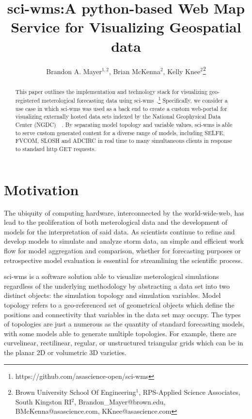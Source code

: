 \documentclass[11pt,twocolumn,twoside]{IEEEtran}
\begin{document}
\title{\vspace{0.2in}\sc sci-wms:A python-based Web Map Service for Visualizing Geospatial data}

\author{Brandon A. Mayer$^{1,2}$, Brian McKenna$^{2}$, Kelly Knee$^{2}$\thanks{Brown University School Of Engineering$^{1}$, RPS-Applied Science Associates, South Kingston RI$^{2}$, Brandon\_Mayer@brown.edu, BMcKenna@asascience.com, KKnee@asascience.com}}

\maketitle
\thispagestyle{fancy}

\begin{abstract}
This paper outlines the implementation and technology stack for
visualizing geo-registered meterological forecasting data using
sci-wms~\cite{wms14}.\footnote{https://github.com/asascience-open/sci-wms}
Specifically, we consider a use case in which sci-wms was used as a
back end to create a custom web-portal for visualizing externally
hosted data sets indexed by the National Geophysical Data Center
(NGDC)~\cite{luettich13}~\cite{luettich12}. By separating model topology and variable values, sci-wms is
able to serve custom generated content for a diverse range of models,
including SELFE, FVCOM, SLOSH and ADCIRC in real time to many
simultaneous clients in response to standard http GET requests.
\end{abstract}

\section{Motivation}
The ubiquity of computing hardware, interconnected by the
world-wide-web, has lead to the proliferation of both meterological
data and the development of models for the interpretation of said
data. As scientists continue to refine and develop models to simulate
and analyze storm data, an simple and efficient work flow for model
aggregation and comparison, whether for forecasting purposes or
retrospective model evaluation is essential for streamlining the
scientific process.

sci-wms is a software solution able to visualize meterological
simulations regardless of the underlying methodology by abstracting a
data set into two distinct objects: the simulation topology and
simulation variables. Model topology refers to a geo-referenced set of
geometrical objects which define the positions and connectivity that
variables in the data set may occupy. The types of topologies are just
a numerous as the quantity of standard forecasting models, with some
models able to generate multiple topologies. For example, there are
curvelinear, rectilinear, regular, or unstructured triangular grids
which can be in the planar 2D or volumetric 3D varieties.
\end{document}
